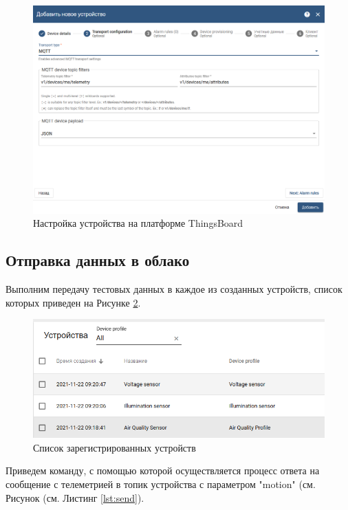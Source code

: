 \documentclass[a4paper,14pt]{extarticle}
\newcommand{\tb}{ThingsBoard~}
\begin{document}
\begin{figure}[h!]
	\centering
	\includegraphics[width=0.7\linewidth]{images/task9-create2}
	\caption{Настройка устройства на платформе \tb}
	\label{fig:task9-create2}
\end{figure}

\subsection{Отправка данных в облако}

Выполним передачу тестовых данных в каждое из созданных устройств, список которых приведен на Рисунке \ref{fig:devices}.

\begin{figure}[h!]
	\centering
	\includegraphics[width=0.66\linewidth]{images/devices}
	\caption{Список зарегистрированных устройств}
	\label{fig:devices}
\end{figure}

Приведем команду, с помощью которой осуществляется процесс ответа на сообщение с телеметрией в топик устройства с параметром "motion" (см. Рисунок (см. Листинг \ref{lst:send}).


%
\end{document}
